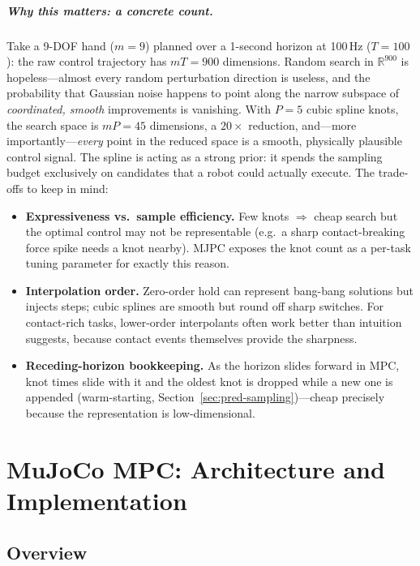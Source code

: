 \documentclass[11pt,twoside]{report}
\theoremstyle{definition}
\theoremstyle{plain}
\theoremstyle{remark}
\newcommand{\R}{\mathbb{R}}
\newcommand{\0}{\bm{0}}
\begin{document}
\paragraph{Why this matters: a concrete count.}
Take a 9-DOF hand ($m=9$) planned over a 1-second horizon at 100\,Hz
($T=100$): the raw control trajectory has $mT=900$ dimensions.
Random search in $\R^{900}$ is hopeless---almost every random
perturbation direction is useless, and the probability that Gaussian
noise happens to point along the narrow subspace of \emph{coordinated,
smooth} improvements is vanishing. With $P=5$ cubic spline knots, the
search space is $mP=45$ dimensions, a $20\times$ reduction, and---more
importantly---\emph{every} point in the reduced space is a smooth,
physically plausible control signal. The spline is acting as a strong
prior: it spends the sampling budget exclusively on candidates that a
robot could actually execute.
The trade-offs to keep in mind:
\begin{itemize}
\item \textbf{Expressiveness vs.\ sample efficiency.} Few knots
      $\Rightarrow$ cheap search but the optimal control may not be
      representable (e.g.\ a sharp contact-breaking force spike needs a
      knot nearby). MJPC exposes the knot count as a per-task tuning
      parameter for exactly this reason.
\item \textbf{Interpolation order.} Zero-order hold can represent
      bang-bang solutions but injects steps; cubic splines are smooth
      but round off sharp switches. For contact-rich tasks,
      lower-order interpolants often work better than intuition
      suggests, because contact events themselves provide the sharpness.
\item \textbf{Receding-horizon bookkeeping.} As the horizon slides
      forward in MPC, knot times slide with it and the oldest knot is
      dropped while a new one is appended (warm-starting,
      Section~\ref{sec:pred-sampling})---cheap precisely because the
      representation is low-dimensional.
\end{itemize}


\chapter{MuJoCo MPC: Architecture and Implementation}
\label{ch:mjpc}

\section{Overview}
\end{document}
